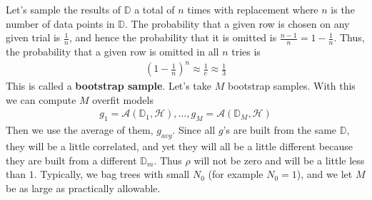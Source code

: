 \documentclass[12pt, a4paper]{article}
\theoremstyle{definition}
\begin{document}
	Let's sample the results of $\mathbb{D}$ a total of $n$ times with replacement
	where $n$ is the number of data points in $\mathbb{D}$.
	The probability that a given row is chosen on any given trial is
	$\frac{1}{n}$, and hence the probability that it is omitted is
	$\frac{n-1}{n}=1-\frac{1}{n}$. Thus, the probability that a given
	row is omitted in all $n$ tries is
	\begin{align*}
		\left(1 - \frac{1}{n}\right)^n\approx \frac{1}{e}\approx \frac{1}{3}
	\end{align*}
	This is called a \textbf{bootstrap sample}. Let's take $M$ bootstrap samples.
	With this we can compute $M$ overfit models
	\begin{align*}
		g_1 = \mathcal{A}(\mathbb{D}_1,\mathcal{H}),\ldots,
		g_M = \mathcal{A}(\mathbb{D}_M, \mathcal{H})
	\end{align*}
	Then we use the average of them, $g_{avg}$. Since all $g$'s are built
	from the same $\mathbb{D}$, they will be a little correlated, and yet
	they will all be a little different because they are built from a different
	$\mathbb{D}_m$. Thus $\rho$ will not be zero and will be a little less
	than $1$. Typically, we bag trees with small $N_0$ (for example $N_0 = 1$),
	and we let $M$ be as large as practically allowable.
\end{document}

